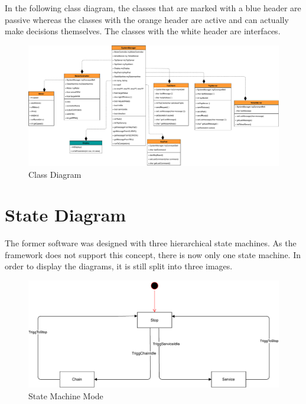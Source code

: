 \documentclass[a4paper,12pt,twoside]{scrreprt}
\begin{document}
In the following class diagram, the classes that are marked with a blue header are passive whereas the classes with the orange header are active and can actually make decisions themselves. The classes with the white header are interfaces. 

\begin{figure}[H]
	\centering
	\includegraphics[width=\textwidth,height=\textheight,keepaspectratio]{classDiagram/ClassDiagram.pdf}
	\caption[Class Diagram]{Class Diagram}
	\label{fig:ClassDiagram}
\end{figure}

\section{State Diagram}
\label{chap:State_Diagram}

The former software was designed with three hierarchical state machines. As the framework does not support this concept, there is now only one state machine. In order to display the diagrams, it is still split into three images. 

\begin{figure}[H]
	\centering
	\includegraphics[width=\textwidth,height=\textheight,keepaspectratio]{stateDiagram/StateMachineMode.pdf}
	\caption[State Machine Mode]{State Machine Mode}
	\label{fig:StateMachineMode}
\end{figure}
\newpage
\end{document}
